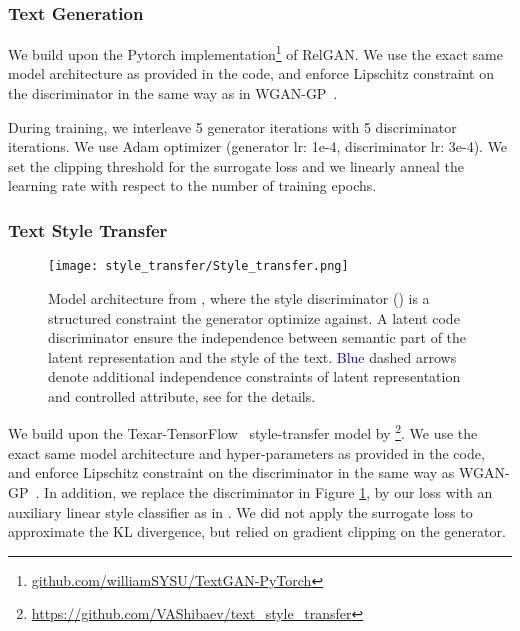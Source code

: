 \documentclass{article}
\newcommand{\0}{\bm{0}}
\begin{document}
\subsubsection{Text Generation}
We build upon the Pytorch implementation\footnote{\href{https://github.com/williamSYSU/TextGAN-PyTorch}{github.com/williamSYSU/TextGAN-PyTorch}} of RelGAN. We use the exact same model architecture as provided in the code, and enforce Lipschitz constraint on the discriminator in the same way as in WGAN-GP~\cite{WGAN}. 

During training, we interleave 5 generator iterations with 5 discriminator iterations. We use Adam optimizer (generator lr: 1e-4, discriminator lr: 3e-4). We set the clipping threshold  for the surrogate loss and we linearly anneal the learning rate with respect to the number of training epochs.

\subsubsection{Text Style Transfer}
\begin{figure}[t]
\vskip 0.2in
\begin{center}
\centerline{\texttt{[image: style\_transfer/Style\_transfer.png]}}
\caption{Model architecture from \cite{tikhonov2019style}, where the style discriminator () is a structured constraint the generator optimize against. A latent code discriminator ensure the independence between semantic part of the latent representation and the style of the text. \textcolor{blue}{Blue} dashed arrows denote additional independence constraints of latent representation and controlled attribute, see \cite{tikhonov2019style} for the details.}
\label{appendix:fig:style_transfer_arch}
\end{center}
\vskip -0.2in
\end{figure}

We build upon the Texar-TensorFlow~\cite{texar} style-transfer model by \citet{tikhonov2019style}\footnote{\href{https://github.com/VAShibaev/text_style_transfer}{https://github.com/VAShibaev/text\_style\_transfer}}. We use the exact same model architecture and hyper-parameters as provided in the code, and enforce Lipschitz constraint on the discriminator in the same way as WGAN-GP~\cite{WGAN}. In addition, we replace the discriminator  in Figure \ref{appendix:fig:style_transfer_arch}, by our loss with an auxiliary linear style classifier as in \citet{ACGAN}. We did not apply the surrogate loss to approximate the KL divergence, but relied on gradient clipping on the generator.


 
\end{document}

